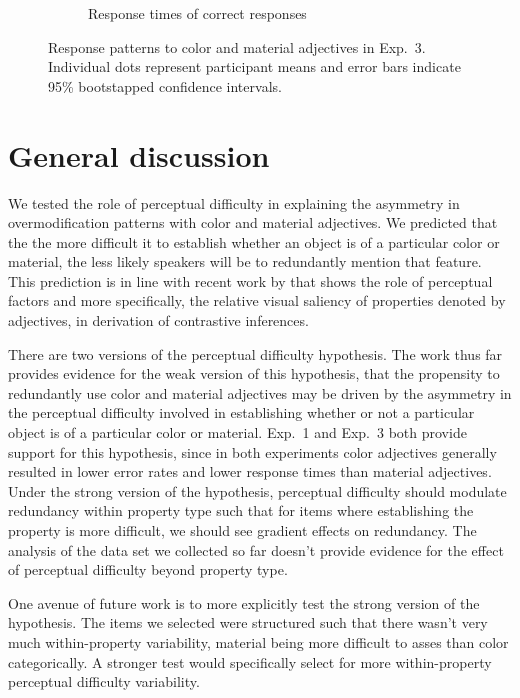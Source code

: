 \documentclass[12pt,letterpaper]{article}
\begin{document}
\begin{figure}[ht]
\begin{subfigure}{.4 \textwidth}
   \caption{Response times of correct responses}
   \label{fig:exp3_b}
   \end{subfigure}
   \caption{Response patterns to color and material adjectives in Exp.~3. Individual dots represent participant means and error bars indicate 95\% bootstapped confidence intervals.}
   \label{fig:exp3}
\end{figure}   

\section{General discussion} 

We tested the role of perceptual difficulty in explaining the asymmetry in overmodification patterns with color and material adjectives. We predicted that the the more difficult it to establish whether an object is of a particular color or material, the less likely speakers will be to redundantly mention that feature. This prediction is in line with recent work by \citet{RubioEtAl2019} that shows the role of perceptual factors and more specifically, the relative visual saliency of properties denoted by adjectives, in derivation of contrastive inferences.

There are two versions of the perceptual difficulty hypothesis. The work thus far provides evidence for the weak version of this hypothesis, that the propensity to redundantly use color and material adjectives may be driven by the asymmetry in the perceptual difficulty involved in establishing whether or not a particular object is of a particular color or material. Exp.~1 and Exp.~3 both provide support for this hypothesis, since in both experiments color adjectives generally resulted in lower error rates and lower response times than material adjectives. Under the strong version of the hypothesis, perceptual difficulty should modulate redundancy within property type such that for items where establishing the property is more difficult, we should see gradient effects on redundancy. The analysis of the data set we collected so far doesn't provide evidence for the effect of perceptual difficulty beyond property type. 

One avenue of future work is to more explicitly test the strong version of the hypothesis. The items we selected were structured such that there wasn't very much within-property variability, material being more difficult to asses than color categorically. A stronger test would specifically select for more within-property perceptual difficulty variability.
\end{document}
